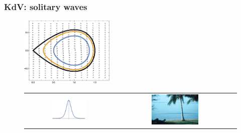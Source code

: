 \documentclass[16pt]{beamer}
\begin{document}
\begin{frame}
\frametitle{KdV: solitary waves}
\fontsize{16}{7.2}\selectfont

\begin{figure}[H]
\begin{center}
\includegraphics[width=0.4\textwidth]{images/KdV3phaseportrait.eps}
\end{center}
\end{figure}

\begin{figure}[H]
\begin{center}
\begin{tabular}{cc}
\includegraphics[width=0.4\textwidth]{images/singlepulse.eps} & \includegraphics[width=0.4\textwidth]{images/beach.jpg} \\
\end{tabular}
\end{center}
\end{figure}
\end{frame}
\end{document}
